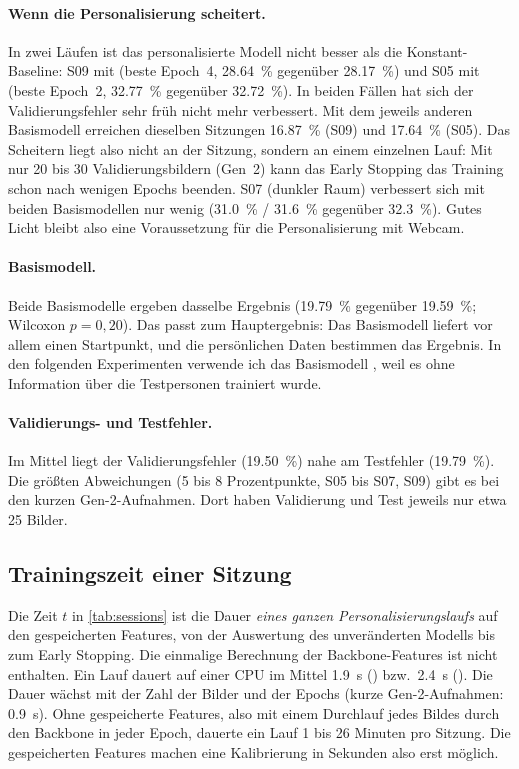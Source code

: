 \paragraph{Wenn die Personalisierung scheitert.}
In zwei Läufen ist das personalisierte Modell nicht besser als die
Konstant-Baseline: S09 mit  (beste Epoch~4,
\SI{28,64}{\percent} gegenüber \SI{28,17}{\percent}) und S05 mit
 (beste Epoch~2, \SI{32,77}{\percent} gegenüber
\SI{32,72}{\percent}). In beiden Fällen hat sich der Validierungsfehler sehr
früh nicht mehr verbessert. Mit dem jeweils anderen Basismodell erreichen
dieselben Sitzungen \SI{16,87}{\percent} (S09) und \SI{17,64}{\percent} (S05).
Das Scheitern liegt also nicht an der Sitzung, sondern an einem einzelnen Lauf:
Mit nur 20 bis 30 Validierungsbildern (Gen~2) kann das Early Stopping das
Training schon nach wenigen Epochs beenden. S07 (dunkler Raum) verbessert sich
mit beiden Basismodellen nur wenig (\SI{31,0}{\percent} /
\SI{31,6}{\percent} gegenüber \SI{32,3}{\percent}). Gutes Licht bleibt also eine
Voraussetzung für die Personalisierung mit Webcam.

\paragraph{Basismodell.}
Beide Basismodelle ergeben dasselbe Ergebnis (\SI{19,79}{\percent} gegenüber
\SI{19,59}{\percent}; Wilcoxon $p=0,20$). Das passt zum Hauptergebnis: Das
Basismodell liefert vor allem einen Startpunkt, und die persönlichen Daten
bestimmen das Ergebnis. In den folgenden Experimenten verwende ich das
Basismodell , weil es ohne Information über die
Testpersonen trainiert wurde.

\paragraph{Validierungs- und Testfehler.} Im Mittel liegt der
Validierungsfehler (\SI{19,50}{\percent}) nahe am Testfehler
(\SI{19,79}{\percent}). Die größten Abweichungen (5 bis 8 Prozentpunkte, S05
bis S07, S09) gibt es bei den kurzen Gen-2-Aufnahmen. Dort haben Validierung
und Test jeweils nur etwa 25 Bilder.

\subsection{Trainingszeit einer Sitzung}
\label{sec:session_time}

Die Zeit $t$ in \cref{tab:sessions} ist die Dauer \emph{eines ganzen
Personalisierungslaufs} auf den gespeicherten Features, von der Auswertung des
unveränderten Modells bis zum Early Stopping. Die einmalige Berechnung der
Backbone-Features ist nicht enthalten. Ein Lauf dauert auf einer CPU im Mittel \SI{1,9}{\second} ()
bzw.\ \SI{2,4}{\second} (). Die Dauer wächst mit der Zahl
der Bilder und der Epochs (kurze Gen-2-Aufnahmen: \SI{0,9}{\second}). Ohne
gespeicherte Features, also mit einem Durchlauf jedes Bildes durch den Backbone
in jeder Epoch, dauerte ein Lauf 1 bis 26 Minuten pro Sitzung. Die gespeicherten
Features machen eine Kalibrierung in Sekunden also erst möglich.

